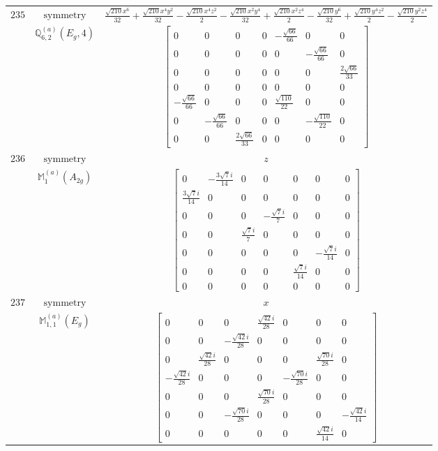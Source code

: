 \documentclass[fleqn,8pt,landscape]{jsarticle}
\begin{document}
\begin{longtable}{ccc}
$ 235 $ & $ \text{symmetry} $ & $ \frac{\sqrt{210} x^{6}}{32} + \frac{\sqrt{210} x^{4} y^{2}}{32} - \frac{\sqrt{210} x^{4} z^{2}}{2} - \frac{\sqrt{210} x^{2} y^{4}}{32} + \frac{\sqrt{210} x^{2} z^{4}}{2} - \frac{\sqrt{210} y^{6}}{32} + \frac{\sqrt{210} y^{4} z^{2}}{2} - \frac{\sqrt{210} y^{2} z^{4}}{2} $ \\
$  $ & $ \mathbb{Q}_{6,2}^{(a)}(E_{g},4) $ & $ \begin{bmatrix} 0 & 0 & 0 & 0 & - \frac{\sqrt{66}}{66} & 0 & 0 \\ 0 & 0 & 0 & 0 & 0 & - \frac{\sqrt{66}}{66} & 0 \\ 0 & 0 & 0 & 0 & 0 & 0 & \frac{2 \sqrt{66}}{33} \\ 0 & 0 & 0 & 0 & 0 & 0 & 0 \\ - \frac{\sqrt{66}}{66} & 0 & 0 & 0 & \frac{\sqrt{110}}{22} & 0 & 0 \\ 0 & - \frac{\sqrt{66}}{66} & 0 & 0 & 0 & - \frac{\sqrt{110}}{22} & 0 \\ 0 & 0 & \frac{2 \sqrt{66}}{33} & 0 & 0 & 0 & 0 \end{bmatrix} $ \\ \hline
$ 236 $ & $ \text{symmetry} $ & $ z $ \\
$  $ & $ \mathbb{M}_{1}^{(a)}(A_{2g}) $ & $ \begin{bmatrix} 0 & - \frac{3 \sqrt{7} i}{14} & 0 & 0 & 0 & 0 & 0 \\ \frac{3 \sqrt{7} i}{14} & 0 & 0 & 0 & 0 & 0 & 0 \\ 0 & 0 & 0 & - \frac{\sqrt{7} i}{7} & 0 & 0 & 0 \\ 0 & 0 & \frac{\sqrt{7} i}{7} & 0 & 0 & 0 & 0 \\ 0 & 0 & 0 & 0 & 0 & - \frac{\sqrt{7} i}{14} & 0 \\ 0 & 0 & 0 & 0 & \frac{\sqrt{7} i}{14} & 0 & 0 \\ 0 & 0 & 0 & 0 & 0 & 0 & 0 \end{bmatrix} $ \\ \hline
$ 237 $ & $ \text{symmetry} $ & $ x $ \\
$  $ & $ \mathbb{M}_{1,1}^{(a)}(E_{g}) $ & $ \begin{bmatrix} 0 & 0 & 0 & \frac{\sqrt{42} i}{28} & 0 & 0 & 0 \\ 0 & 0 & - \frac{\sqrt{42} i}{28} & 0 & 0 & 0 & 0 \\ 0 & \frac{\sqrt{42} i}{28} & 0 & 0 & 0 & \frac{\sqrt{70} i}{28} & 0 \\ - \frac{\sqrt{42} i}{28} & 0 & 0 & 0 & - \frac{\sqrt{70} i}{28} & 0 & 0 \\ 0 & 0 & 0 & \frac{\sqrt{70} i}{28} & 0 & 0 & 0 \\ 0 & 0 & - \frac{\sqrt{70} i}{28} & 0 & 0 & 0 & - \frac{\sqrt{42} i}{14} \\ 0 & 0 & 0 & 0 & 0 & \frac{\sqrt{42} i}{14} & 0 \end{bmatrix} $ \\ \hline

\end{longtable}
\end{document}
